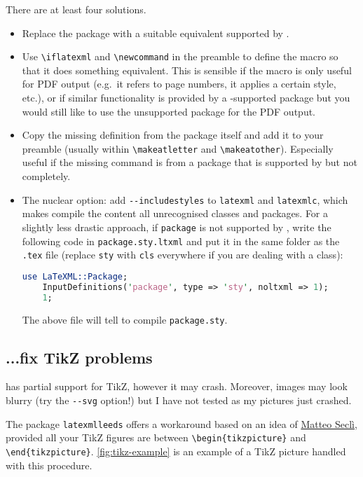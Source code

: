 \documentclass[a4paper]{article}
\def\ltxinline{\lstinline[style=latexml]}
\theoremstyle{definition}
\begin{document}
There are at least four solutions.
\begin{itemize}
  \item Replace the package with a suitable equivalent supported by \LaTeXML{}.
  \item Use \ltxinline|\iflatexml| and \ltxinline|\newcommand| in the preamble to define the macro so that it does something equivalent. This is sensible if the macro is only useful for PDF output (e.g.\ it refers to page numbers, it applies a certain style, etc.), or if similar functionality is provided by a \LaTeXML{}-supported package but you would still like to use the unsupported package for the PDF output.
  \item Copy the missing definition from the package itself and add it to your preamble (usually within \ltxinline|\makeatletter| and \ltxinline|\makeatother|). Especially useful if the missing command is from a package that is supported by \LaTeXML{} but not completely.
  \item The nuclear option: add \verb|--includestyles| to \verb|latexml| and \verb|latexmlc|, which makes \LaTeXML{} compile the content all unrecognised classes and packages. For a slightly less drastic approach, if \verb|package| is not supported by \LaTeXML{}, write the following code in \verb|package.sty.ltxml| and put it in the same folder as the \verb|.tex| file (replace \verb|sty| with \verb|cls| everywhere if you are dealing with a class):
  \begin{lstlisting}[language=Perl]
    use LaTeXML::Package;
    InputDefinitions('package', type => 'sty', noltxml => 1);
    1;
  \end{lstlisting}
  The above file will tell \LaTeXML{} to compile \verb|package.sty|.
\end{itemize}

\subsection{...fix TikZ problems}
\label{sub:tikz-howto}
\LaTeXML{} has partial support for TikZ, however it may crash. Moreover, images may look blurry (try the \verb|--svg| option!) but I have not tested as my pictures just crashed.

The package \verb|latexmlleeds| offers a workaround based on an idea of \href{https://github.com/brucemiller/LaTeXML/issues/945}{Matteo Seclì}, provided all your TikZ figures are between \ltxinline|\begin{tikzpicture}| and \ltxinline|\end{tikzpicture}|. \autoref{fig:tikz-example} is an example of a TikZ picture handled with this procedure.
\end{document}
